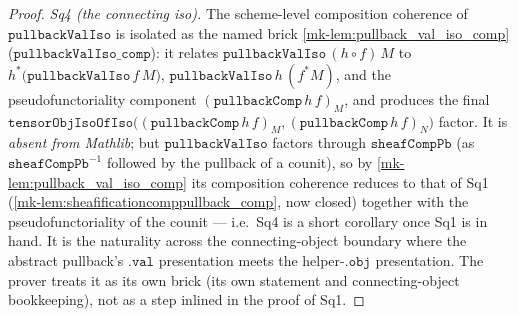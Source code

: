 \begin{proof}
  \emph{Sq4 (the connecting iso).} The scheme-level composition coherence of
  \(\mathtt{pullbackValIso}\) is isolated as the named brick \ref{mk-lem:pullback_val_iso_comp}
  (\(\mathtt{pullbackValIso\_comp}\)): it relates \(\mathtt{pullbackValIso}\,(h \circ f)\,M\) to
  \(h^{*}\bigl(\mathtt{pullbackValIso}\,f\,M\bigr)\),
  \(\mathtt{pullbackValIso}\,h\,(f^{*}M)\), and the pseudofunctoriality component
  \((\mathtt{pullbackComp}\,h\,f)_M\), and produces the final
  \(\mathtt{tensorObjIsoOfIso}\bigl((\mathtt{pullbackComp}\,h\,f)_M,
  (\mathtt{pullbackComp}\,h\,f)_N\bigr)\) factor. It is \emph{absent from Mathlib}; but
  \(\mathtt{pullbackValIso}\) factors through \(\mathtt{sheafCompPb}\) (as
  \(\mathtt{sheafCompPb}^{-1}\) followed by the pullback of a counit), so by
  \ref{mk-lem:pullback_val_iso_comp} its composition coherence reduces to that of Sq1
  (\ref{mk-lem:sheafificationcomppullback_comp}, now closed) together with the
  pseudofunctoriality of the counit --- i.e.\ Sq4 is a short corollary once Sq1 is in hand. It
  is the naturality across the connecting-object boundary where the abstract pullback's
  \(\mathtt{.val}\) presentation meets the helper-\(\mathtt{.obj}\) presentation. The prover
  treats it as its own brick (its own statement and connecting-object bookkeeping), not as a
  step inlined in the proof of Sq1.


\end{proof}
